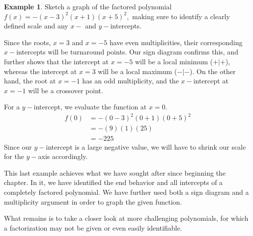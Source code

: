 \documentclass[12pt]{book}
\theoremstyle{definition}
\newtheorem{example}{Example}
\begin{document}
\begin{example}
Sketch a graph of the factored polynomial $f(x)=-(x-3)^2(x+1)(x+5)^2,$ making sure to identify a clearly defined scale and any $x-$ and $y-$intercepts.
\par
Since the roots, $x=3$ and $x=-5$ have even multiplicities, their corresponding $x-$intercepts will be turnaround points.  Our sign diagram confirms this, and further shows that the intercept at $x=-5$ will be a local minimum ($+|+$), whereas the intercept at $x=3$ will be a local maximum ($-|-$).  On the other hand, the root at $x=-1$ has an odd multiplicity, and the $x-$intercept at $x=-1$ will be a crossover point.
\par
For a $y-$intercept, we evaluate the function at $x=0$.
\begin{equation*}
\begin{split}
f(0)&=-(0-3)^2(0+1)(0+5)^2\\
&=-(9)(1)(25)\\
&=-225
\end{split}
\end{equation*}
Since our $y-$intercept is a large negative value, we will have to shrink our scale for the $y-$axis accordingly.
\begin{center}
\end{center}
\end{example}
This last example achieves what we have sought after since beginning the chapter.  In it, we have identified the end behavior and all intercepts of a completely factored polynomial.  We have further used both a sign diagram and a multiplicity argument in order to graph the given function.
\par
What remains is to take a closer look at more challenging polynomials, for which a factorization may not be given or even easily identifiable.
\end{document}
